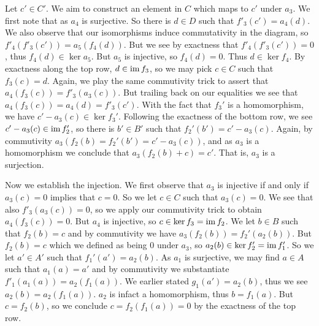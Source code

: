\begin{questions}
\begin{solution}
    Let $c' \in C'$. We aim to construct an element in $C$ which maps to $c'$ under $a_3$. We first note that as $a_4$ is surjective. So there is $d \in D$ such that $f'_3(c') = a_4(d)$. We also observe that our isomorphisms induce commutativity in the diagram, so $f'_4(f'_3(c')) = a_5(f_4(d))$. But we see by exactness that $f'_4(f'_3(c')) = 0$, thus $f_4(d) \in \ker a_5$. But $a_5$ is injective, so $f_4(d) = 0$. Thus $d \in \ker f_4$. By exactness along the top row, $d \in \operatorname*{im} f_3$, so we may pick $c \in C$ such that $f_3(c) = d$. Again, we play the same commutivity trick to assert that $a_4(f_3(c)) = f'_3(a_3(c))$. But trailing back on our equalities we see that $a_4(f_3(c)) = a_4(d) = f'_3(c')$. With the fact that $f_3'$ is a homomorphism, we have $c' - a_3(c) \in \ker f_3'$. Following the exactness of the bottom row, we see $c' - a_3(c) \in \operatorname*{im} f'_2$, so there is $b' \in B'$ such that $f_2'(b') = c' - a_3(c)$. Again, by commutivity $a_3(f_2(b) = f_2'(b') = c' - a_3(c))$, and as $a_3$ is a homomorphism we conclude that $a_3(f_2(b) + c) = c'$. That is, $a_3$ is a surjection.

    Now we establish the injection. We first observe that $a_3$ is injective if and only if $a_3(c) = 0$ implies that $c = 0$. So we let $c \in C$ such that $a_3(c) = 0$. We see that also $f'_3(a_3(c)) = 0$, so we apply our commutivity trick to obtain $a_4(f_3(c)) = 0$. But $a_4$ is injective, so $c \in \ker f_3 = \operatorname*{im} f_2$. We let $b \in B$ such that $f_2(b) = c$ and by commutivity we have $a_3(f_2(b)) = f_2'(a_2(b))$. But $f_2(b) = c$ which we defined as being $0$ under $a_3$, so $a_2(b) \in \ker f'_2 = \operatorname*{im} f'_1$. So we let $a' \in A'$ such that $f_1'(a') = a_2(b)$. As $a_1$ is surjective, we may find $a \in A$ such that $a_1(a) = a'$ and by commutivity we substantiate $f'_1(a_1(a)) = a_2(f_1(a))$. We earlier stated $g_1(a') = a_2(b)$, thus we see $a_2(b) = a_2(f_1(a))$. $a_2$ is infact a homomorphism, thus $b = f_1(a)$. But $c = f_2(b)$, so we conclude $c = f_2(f_1(a)) = 0$ by the exactness of the top row.
  \end{solution}
\end{questions}

